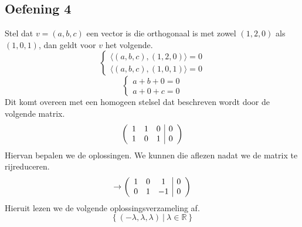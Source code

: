 \documentclass[lineaire_algebra_oplossingen.tex]{subfiles}
\begin{document}
\subsection{Oefening 4}
Stel dat $v=(a,b,c)$ een vector is die orthogonaal is met zowel $(1,2,0)$ als $(1,0,1)$, dan geldt voor $v$ het volgende.
\[
\left\{
\begin{array}{c}
\langle (a,b,c) , (1,2,0) \rangle = 0\\
\langle (a,b,c) , (1,0,1) \rangle = 0
\end{array}
\right.
\]
\[
\left\{
\begin{array}{c}
a + b + 0 = 0\\
a + 0 + c = 0
\end{array}
\right.
\]
Dit komt overeen met een homogeen stelsel dat beschreven wordt door de volgende matrix.
\[
\left(
\begin{array}{c c c | c}
1 & 1 & 0 & 0\\
1 & 0 & 1 & 0
\end{array}
\right)
\]
Hiervan bepalen we de oplossingen. We kunnen die aflezen nadat we de matrix te rijreduceren.
\[
\rightarrow
\left(
\begin{array}{c c c | c}
1 & 0 & 1 & 0\\
0 & 1 & -1 & 0
\end{array}
\right)
\]
Hieruit lezen we de volgende oplossingsverzameling af.
\[
\left\{
(-\lambda,\lambda,\lambda)\ |\ \lambda\in\mathbb{R}
\right\}
\]
\end{document}
